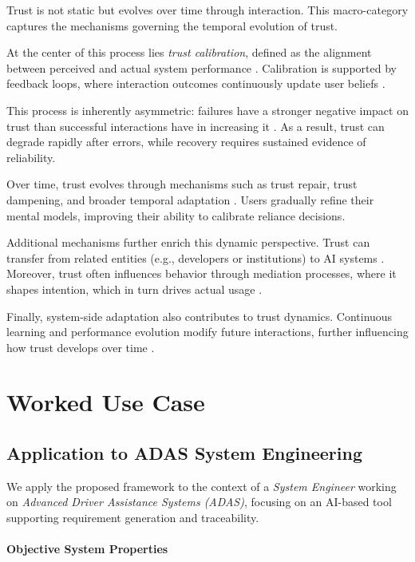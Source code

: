 \documentclass[sigconf]{acmart}
\begin{document}
Trust is not static but evolves over time through interaction. This macro-category captures the mechanisms governing the temporal evolution of trust.

At the center of this process lies \emph{trust calibration}, defined as the alignment between perceived and actual system performance \cite{jacovi_2021_formalizing_trust_ai}. Calibration is supported by feedback loops, where interaction outcomes continuously update user beliefs \cite{john_measurement_of_trust, de_visser_longitudinal_trust}.

This process is inherently asymmetric: failures have a stronger negative impact on trust than successful interactions have in increasing it \cite{kaplan2021trust}. As a result, trust can degrade rapidly after errors, while recovery requires sustained evidence of reliability.

Over time, trust evolves through mechanisms such as trust repair, trust dampening, and broader temporal adaptation \cite{de_visser_longitudinal_trust, vereschak2021evaluate}. Users gradually refine their mental models, improving their ability to calibrate reliance decisions.

Additional mechanisms further enrich this dynamic perspective. Trust can transfer from related entities (e.g., developers or institutions) to AI systems \cite{schepman_general_attitude}. Moreover, trust often influences behavior through mediation processes, where it shapes intention, which in turn drives actual usage \cite{choudhury_chat_gpt}.

Finally, system-side adaptation also contributes to trust dynamics. Continuous learning and performance evolution modify future interactions, further influencing how trust develops over time \cite{wang2019artificial}.

\section{Worked Use Case}

\subsection{Application to ADAS System Engineering}

We apply the proposed framework to the context of a \emph{System Engineer} working on \emph{Advanced Driver Assistance Systems (ADAS)}, focusing on an AI-based tool supporting requirement generation and traceability.

\paragraph{Objective System Properties}
\end{document}
